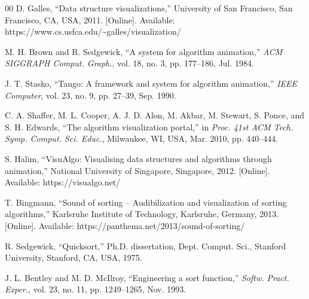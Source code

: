 \documentclass[conference]{IEEEtran}
\begin{document}
\begin{thebibliography}{00}
D. Galles,
``Data structure visualizations,''
University of San Francisco, San Francisco, CA, USA, 2011. [Online].
Available: https://www.cs.usfca.edu/\~{}galles/visualization/

M. H. Brown and R. Sedgewick,
``A system for algorithm animation,''
\textit{ACM SIGGRAPH Comput. Graph.},
vol. 18, no. 3, pp. 177--186, Jul. 1984.

J. T. Stasko,
``Tango: A framework and system for algorithm animation,''
\textit{IEEE Computer},
vol. 23, no. 9, pp. 27--39, Sep. 1990.

C. A. Shaffer, M. L. Cooper, A. J. D. Alon, M. Akbar, M. Stewart,
S. Ponce, and S. H. Edwards,
``The algorithm visualization portal,''
in \textit{Proc. 41st ACM Tech. Symp. Comput. Sci. Educ.},
Milwaukee, WI, USA, Mar. 2010, pp. 440--444.

S. Halim,
``VisuAlgo: Visualising data structures and algorithms through animation,''
National University of Singapore, Singapore, 2012. [Online].
Available: https://visualgo.net/

T. Bingmann,
``Sound of sorting -- Audibilization and visualization of sorting
algorithms,''
Karlsruhe Institute of Technology, Karlsruhe, Germany, 2013. [Online].
Available: https://panthema.net/2013/sound-of-sorting/

R. Sedgewick,
``Quicksort,''
Ph.D. dissertation, Dept. Comput. Sci., Stanford University,
Stanford, CA, USA, 1975.

J. L. Bentley and M. D. McIlroy,
``Engineering a sort function,''
\textit{Softw. Pract. Exper.},
vol. 23, no. 11, pp. 1249--1265, Nov. 1993.

\end{thebibliography}
\end{document}
